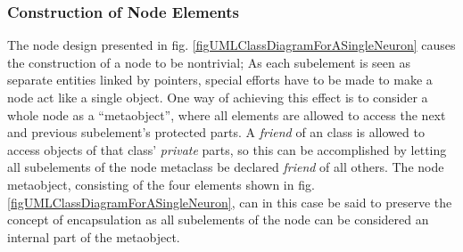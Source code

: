 	

		\subsubsection{Construction of Node Elements}
			The node design presented in fig. \ref{figUMLClassDiagramForASingleNeuron} causes the construction of a node to be nontrivial; 
				As each subelement is seen as separate entities linked by pointers, special efforts have to be made to make a node act like a single object.
			One way of achieving this effect is to consider a whole node as a ``metaobject'', where all elements are allowed to access the next and previous subelement's protected parts.
			A \emph{friend} of an class is allowed to access objects of that class' \emph{private} parts\cite{Stroustrup2000KAP11}, so this can be accomplished by letting all subelements of the node metaclass be declared \emph{friend} of all others.
			The node metaobject, consisting of the four elements shown in fig. \ref{figUMLClassDiagramForASingleNeuron}, can in this case be said to preserve 
				the concept of encapsulation	as all subelements of the node can be considered an internal part of the metaobject. 
			
